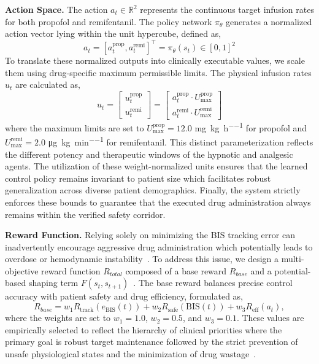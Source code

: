 \documentclass[pdflatex,sn-mathphys-num]{sn-jnl}%
\newcommand{\BfPara}[1]{{\noindent\bf#1.}\xspace}
\theoremstyle{thmstyleone}%
\theoremstyle{thmstyletwo}%
\theoremstyle{thmstylethree}%
\begin{document}
\BfPara{Action Space}
The action $a_t \in \mathbb{R}^2$ represents the continuous target infusion rates for both propofol and remifentanil. The policy network $\pi_\theta$ generates a normalized action vector lying within the unit hypercube, defined as,
\begin{equation}
    a_t = [a_t^{\text{prop}}, a_t^{\text{remi}}]^\top = \pi_\theta(s_t) \in [0, 1]^2
\end{equation}
To translate these normalized outputs into clinically executable values, we scale them using drug-specific maximum permissible limits. The physical infusion rates $u_t$ are calculated as,
\begin{equation}
    u_t = \begin{bmatrix} 
    u_t^{\text{prop}} \\ 
    u_t^{\text{remi}} 
    \end{bmatrix} 
    = 
    \begin{bmatrix} 
    a_t^{\text{prop}} \cdot U_{\max}^{\text{prop}} \\ 
    a_t^{\text{remi}} \cdot U_{\max}^{\text{remi}} 
    \end{bmatrix}
%     
\end{equation}
where the maximum limits are set to $U_{\max}^{\text{prop}} = 12.0$ \si{\milli\gram\per\kilogram\per\hour} for propofol and $U_{\max}^{\text{remi}} = 2.0$ \si{\micro\gram\per\kilogram\per\minute} for remifentanil. This distinct parameterization reflects the different potency and therapeutic windows of the hypnotic and analgesic agents. The utilization of these weight-normalized units ensures that the learned control policy remains invariant to patient size which facilitates robust generalization across diverse patient demographics. Finally, the system strictly enforces these bounds to guarantee that the executed drug administration always remains within the verified safety corridor.

\BfPara{Reward Function}
Relying solely on minimizing the BIS tracking error can inadvertently encourage aggressive drug administration which potentially leads to overdose or hemodynamic instability~\citep{moo_14_rei}. To address this issue, we design a multi-objective reward function $R_{total}$ composed of a base reward $R_{base}$ and a potential-based shaping term $F(s_t, s_{t+1})$~\citep{ng_99_poli}. The base reward balances precise control accuracy with patient safety and drug efficiency, formulated as,
\begin{equation}
    R_{base} = w_1 R_{\text{track}}(e_{\text{BIS}}(t)) + w_2 R_{\text{safe}}(\text{BIS}(t)) + w_3 R_{\text{eff}}(a_t),      
\end{equation}
where the weights are set to $w_1=1.0$, $w_2=0.5$, and $w_3=0.1$. These values are empirically selected to reflect the hierarchy of clinical priorities where the primary goal is robust target maintenance followed by the strict prevention of unsafe physiological states and the minimization of drug wastage~\citep{sch_22_con}.
\end{document}
